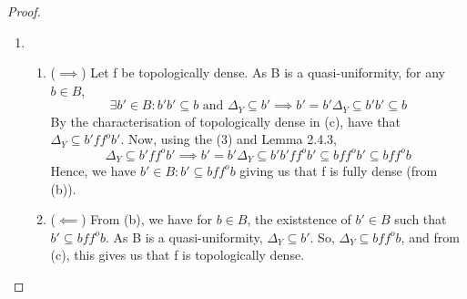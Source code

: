 \documentclass[18pt,a4paper]{article}
\theoremstyle{definition}
\begin{document}
\begin{proof}
\begin{enumerate}[label=(\alph*)]
\item \begin{enumerate}[label=(\roman*)]
	\item
			($\implies $) Let f be topologically dense. As B is a quasi-uniformity, for any $b \in B$,
			\begin{equation}\exists b' \in B : b'b' \subseteq b \text{ and } \Delta_Y \subseteq b'
				\implies b'=b'\Delta_Y \subseteq b'b' \subseteq b
			\end{equation}
			By the characterisation of topologically dense in (c), have that $\Delta_Y \subseteq b'f f^o b'$.
			Now, using the (3) and Lemma 2.4.3,
			\[ \Delta_Y \subseteq b'f f^o b' \implies b'=b'\Delta_Y \subseteq b'b'f f^o b' \subseteq bf f^o b'
			\subseteq bf f^o b\]
			Hence, we have $b'\in B : b' \subseteq bf f^o b$ giving us that f is fully dense (from (b)).
		\item ($\impliedby$) From (b), we have for $b \in B$, the existstence of $b' \in B$ such that $
			b' \subseteq bf f^o b$. As B is a quasi-uniformity, $\Delta_Y \subseteq b'$. So,
			$\Delta_Y \subseteq bf f^o b$, and from (c), this gives us that f is topologically dense. \qedhere
	\end{enumerate}
\end{enumerate}
\end{proof}
\end{document}
